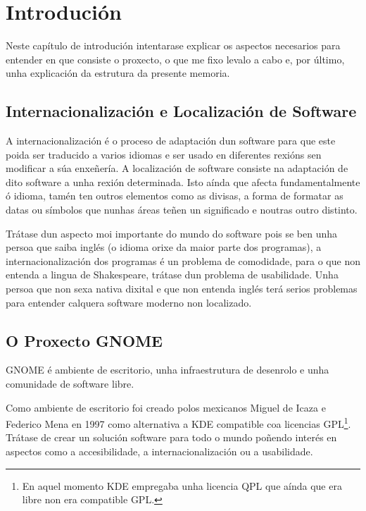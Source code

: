 %
%

\chapter[Introducción]{Introdución}

Neste capítulo de introdución intentarase explicar os aspectos necesarios para entender en que consiste o proxecto, o que me fixo levalo a cabo e, por último, unha explicación da estrutura da presente memoria.

\section{Internacionalización e Localización de Software}
A internacionalización é o proceso de adaptación dun software para que este poida ser traducido a varios idiomas e ser usado en diferentes rexións sen modificar a súa enxeñería. A localización de software consiste na adaptación de dito software a unha rexión determinada. Isto aínda que afecta fundamentalmente ó idioma, tamén ten outros elementos como as divisas, a forma de formatar as datas ou símbolos que nunhas áreas teñen un significado e noutras outro distinto.

Trátase dun aspecto moi importante do mundo do software pois se ben unha persoa que saiba inglés (o idioma orixe da maior parte dos programas), a internacionalización dos programas é un problema de comodidade, para o que non entenda a lingua de Shakespeare, trátase dun problema de usabilidade. Unha persoa que non sexa nativa dixital e que non entenda inglés terá serios problemas para entender calquera software moderno non localizado.

\section{O Proxecto GNOME}
GNOME é ambiente de escritorio, unha infraestrutura de desenrolo e unha comunidade de software libre.

Como ambiente de escritorio foi creado polos mexicanos Miguel de Icaza e Federico Mena en 1997 como alternativa a KDE compatible coa licencias GPL\footnote{En aquel momento KDE empregaba unha licencia QPL que aínda que era libre non era compatible GPL.}. Trátase de crear un solución software para todo o mundo poñendo interés en aspectos como a accesibilidade, a internacionalización ou a usabilidade.

